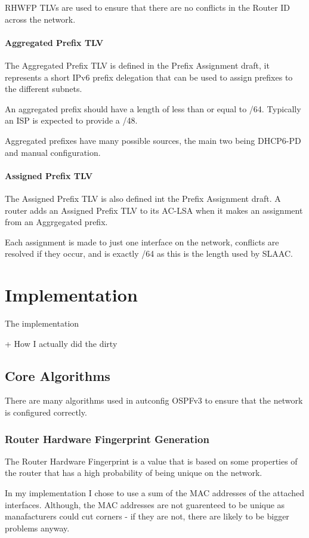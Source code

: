 \documentclass[12pt]{report}
\begin{document}
RHWFP TLVs are used to ensure that there are no conflicts in the Router ID across the network.

\subsubsection{Aggregated Prefix TLV}
The Aggregated Prefix TLV is defined in the Prefix Assignment draft, it represents a short IPv6 prefix delegation that can be used to assign prefixes to the different subnets. 

An aggregated prefix should have a length of less than or equal to /64. Typically an ISP is expected to provide a /48.

Aggregated prefixes have many possible sources, the main two being DHCP6-PD and manual configuration. 

\subsubsection{Assigned Prefix TLV}
The Assigned Prefix TLV is also defined int the Prefix Assignment draft. A router adds an Assigned Prefix TLV to its AC-LSA when it makes an assignment from an Aggrgegated prefix. 

Each assignment is made to just one interface on the network, conflicts are resolved if they occur, and is exactly /64 as this is the length used by SLAAC.

\chapter{Implementation}
The implementation

+ How I actually did the dirty

\section{Core Algorithms}
There are many algorithms used in autconfig OSPFv3 to ensure that the network is 
configured correctly.

\subsection{Router Hardware Fingerprint Generation}
The Router Hardware Fingerprint is a value that is based on some properties of the 
router that has a high probability of being unique on the network. 

In my implementation I chose to use a sum of the MAC addresses of the attached 
interfaces. Although, the MAC addresses are not guarenteed to be unique as 
manafacturers could cut corners - if they are not, there are likely to be bigger 
problems anyway.
\end{document}
